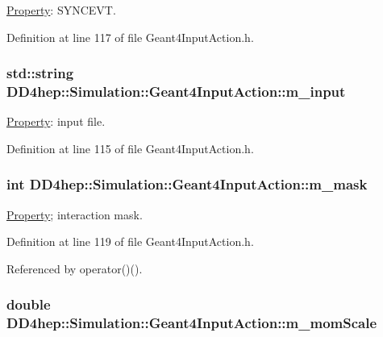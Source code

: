 \hyperlink{class_d_d4hep_1_1_property}{Property}: SYNCEVT. 

Definition at line 117 of file Geant4InputAction.h.\hypertarget{class_d_d4hep_1_1_simulation_1_1_geant4_input_action_ac104781f934d0a6737dba78a2dfa6931}{
\subsubsection[{m\_\-input}]{\setlength{\rightskip}{0pt plus 5cm}std::string {\bf DD4hep::Simulation::Geant4InputAction::m\_\-input}}}
\label{class_d_d4hep_1_1_simulation_1_1_geant4_input_action_ac104781f934d0a6737dba78a2dfa6931}


\hyperlink{class_d_d4hep_1_1_property}{Property}: input file. 

Definition at line 115 of file Geant4InputAction.h.\hypertarget{class_d_d4hep_1_1_simulation_1_1_geant4_input_action_a850fdde95d63db4a76929fbda7ccf35e}{
\subsubsection[{m\_\-mask}]{\setlength{\rightskip}{0pt plus 5cm}int {\bf DD4hep::Simulation::Geant4InputAction::m\_\-mask}}}
\label{class_d_d4hep_1_1_simulation_1_1_geant4_input_action_a850fdde95d63db4a76929fbda7ccf35e}


\hyperlink{class_d_d4hep_1_1_property}{Property}; interaction mask. 

Definition at line 119 of file Geant4InputAction.h.

Referenced by operator()().\hypertarget{class_d_d4hep_1_1_simulation_1_1_geant4_input_action_a1227cac9486e4a389da69f7078b93637}{
\subsubsection[{m\_\-momScale}]{\setlength{\rightskip}{0pt plus 5cm}double {\bf DD4hep::Simulation::Geant4InputAction::m\_\-momScale}}}
\label{class_d_d4hep_1_1_simulation_1_1_geant4_input_action_a1227cac9486e4a389da69f7078b93637}


